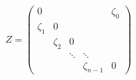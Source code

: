 \begin{equation}
Z = \begin{pmatrix}0 &&&&\zeta_{0}\\
\zeta_1&0 &&&\\
&\zeta_2&0&&\\
& &\ddots&\ddots&\\
&&&\zeta_{n-1}&0
\end{pmatrix}
\end{equation}

